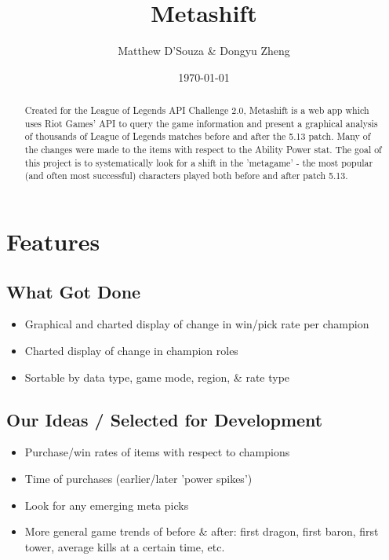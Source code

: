 \documentclass{article}
\title{Metashift}
\date{\today}
\author{Matthew D'Souza \& Dongyu Zheng}
\begin{document}
\maketitle
{}

\newpage
\begin{abstract}
    Created for the League of Legends API Challenge 2.0, Metashift is a web app which uses Riot Games' API to query the game information and present a graphical analysis of thousands of League of Legends matches before and after the 5.13 patch. Many of the changes were made to the items with respect to the Ability Power stat. The goal of this project is to systematically look for a shift in the 'metagame' - the most popular (and often most successful) characters played both before and after patch 5.13.
\end{abstract}

\newpage
\tableofcontents

\newpage
{}



\section{Features}

\subsection{What Got Done}
\begin{itemize}
    \item Graphical and charted display of change in win/pick rate per champion
    \item Charted display of change in champion roles 
    \item Sortable by data type, game mode, region, \& rate type
\end{itemize}

\subsection{Our Ideas / Selected for Development}
\begin{itemize}
    \item Purchase/win rates of items with respect to champions
    \item Time of purchases (earlier/later 'power spikes')
    \item Look for any emerging meta picks
    \item More general game trends of before \& after: first dragon, first baron, first tower, average kills at a certain time, etc.
\end{itemize}
\end{document}
